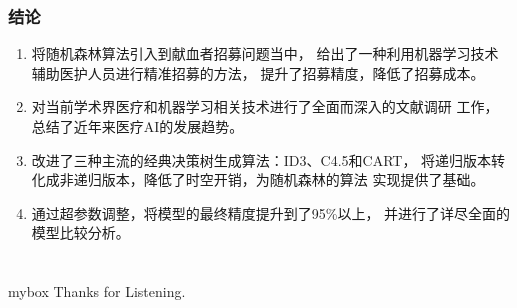 \documentclass[10pt,aspectratio=43,mathserif]{beamer}
\begin{document}
		\begin{frame}
		  \frametitle{\textbf{结论}}
          \begin{enumerate}
            \item 将随机森林算法引入到献血者招募问题当中，
            给出了一种利用机器学习技术辅助医护人员进行精准招募的方法，
            提升了招募精度，降低了招募成本。
            \item 对当前学术界医疗和机器学习相关技术进行了全面而深入的文献调研
            工作，总结了近年来医疗AI的发展趋势。
            \item 改进了三种主流的经典决策树生成算法：ID3、C4.5和CART，
            将递归版本转化成非递归版本，降低了时空开销，为随机森林的算法
            实现提供了基础。
            \item 通过超参数调整，将模型的最终精度提升到了95\%以上，
            并进行了详尽全面的模型比较分析。
        \end{enumerate}
        
		\end{frame}


\section*{}
            \begin{frame}

                \begin{center}
                    \begin{minipage}{1\textwidth}
                        \begin{beamercolorbox}[wd=0.70\textwidth, rounded=true, shadow=true]{mybox}
                        \LARGE \centering Thanks for Listening.
                        \end{beamercolorbox}
                    \end{minipage}
                \end{center}

            \end{frame}
\end{document}
